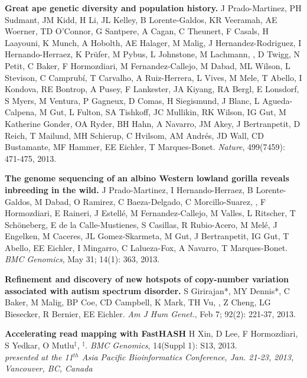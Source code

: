 \vspace{-.2cm}
    {\bf Great ape genetic diversity and population history.}
    J Prado-Martinez, PH Sudmant, JM Kidd, H Li, JL Kelley, B Lorente-Galdos, KR Veeramah, AE Woerner, TD O’Connor, G Santpere, A Cagan, C Theunert, F Casals, H Laayouni, K Munch, A Hobolth, AE Halager, M Malig, J Hernandez-Rodriguez, I Hernando-Herraez, K Prüfer, M Pybus, L Johnstone, M Lachmann, \calkan{}, D Twigg, N Petit, C Baker, F Hormozdiari, M Fernandez-Callejo, M Dabad, ML Wilson, L Stevison, C Camprubí, T Carvalho, A Ruiz-Herrera, L Vives, M Mele, T Abello, I Kondova, RE Bontrop, A Pusey, F Lankester, JA Kiyang, RA Bergl, E Lonsdorf, S Myers, M Ventura, P Gagneux, D Comas, H Siegismund, J Blanc, L Agueda-Calpena, M Gut, L Fulton, SA Tishkoff, JC Mullikin, RK Wilson, IG Gut, M Katherine Gonder, OA Ryder, BH Hahn, A Navarro, JM Akey, J Bertranpetit, D Reich, T Mailund, MH Schierup, C Hvilsom, AM Andrés, JD Wall, CD Bustamante, MF Hammer, EE Eichler, T Marques-Bonet.
    {\em Nature}, 499(7459): 471-475, 2013.
      


\vspace{-.2cm}
    {\bf The genome sequencing of an albino Western lowland gorilla reveals inbreeding in the wild.}
    J Prado-Martinez, I Hernando-Herraez, B Lorente-Galdos, M Dabad, O Ramirez, C Baeza-Delgado, C Morcillo-Suarez, \calkan{}, F Hormozdiari, E Raineri, J Estellé, M Fernandez-Callejo, M Valles, L Ritscher, T Schöneberg, E de la Calle-Mustienes, S Casillas, R Rubio-Acero, M Melé, J Engelken, M Caceres, JL Gomez-Skarmeta, M Gut, J Bertranpetit, IG Gut, T Abello, EE Eichler, I Mingarro, C Lalueza-Fox, A Navarro, T Marques-Bonet.
    {\em BMC Genomics}, May 31; 14(1): 363, 2013.


\vspace{-.2cm}
        {\bf Refinement and discovery of new hotspots of copy-number variation associated with autism spectrum disorder.}
        S Girirajan*, MY Dennis*, C Baker, M Malig, BP Coe, CD Campbell, K Mark, TH Vu,
        \calkan{}, Z Cheng, LG Biesecker, R Bernier, EE Eichler.
        {\em Am J Hum Genet.}, Feb 7; 92(2): 221-37, 2013.

\vspace{-.2cm}
        {\bf Accelerating read mapping with FastHASH}
        H Xin, D Lee, F Hormozdiari, S Yedkar, O Mutlu$^\ddag$, \calkan{}$^\ddag$.
        {\em BMC Genomics}, 14(Suppl 1): S13, 2013.\\
        \hspace*{1cm} {\footnotesize {\em presented at the  11$^{th}$  Asia Pacific Bioinformatics Conference,
            Jan. 21-23, 2013, Vancouver, BC, Canada}}
       
